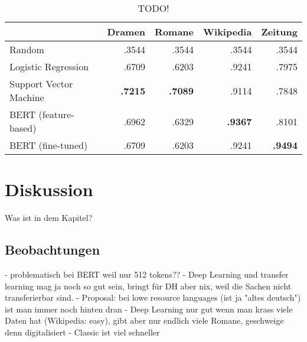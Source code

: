 \begin{table}
\label{scoretable}
\centering
\begin{tabular}{lrrrr}
\toprule
{} & Dramen  &    Romane &  Wikipedia &  Zeitung\\
\midrule

Random&  .3544&.3544&.3544&.3544 \\
Logistic Regression&.6709&.6203&.9241&.7975 \\
Support Vector Machine&\textbf{.7215}&\textbf{.7089}&.9114&.7848 \\
BERT (feature-based)&.6962&.6329&\textbf{.9367}&.8101 \\
BERT (fine-tuned)&.6709&.6203&.9241&\textbf{.9494} \\

\bottomrule
\end{tabular}
\caption{TODO!}
\end{table}






\chapter{Diskussion}
\label{diskussion}
Was ist in dem Kapitel?


\section{Beobachtungen}
\label{beobachtungen}
- problematisch bei BERT weil nur 512 tokens??
- Deep Learning und transfer learning mag ja noch so gut sein, bringt für DH aber nix, weil die Sachen nicht transferierbar sind.
- Proposal: bei lowe resource languages (ist ja "altes deutsch") ist man immer noch hinten dran
- Deep Learning nur gut wenn man krass viele Daten hat (Wikipedia: easy), gibt aber nur endlich viele Romane, geschweige denn digitalisiert
- Classic ist viel schneller



